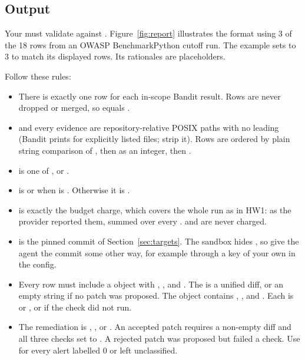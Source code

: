 \documentclass[9pt,letterpaper]{article}
\begin{document}
\subsection{Output}\label{sec:output}

Your  must validate against .
Figure~\ref{fig:report} illustrates the format using 3 of the 18 rows from an
OWASP BenchmarkPython cutoff run. The example sets  to 3 to
match its displayed rows. Its rationales are placeholders.

Follow these rules:
\begin{itemize}
\item There is exactly one row for each in-scope Bandit result. Rows are never
  dropped or merged, so  equals .
\item {} and every evidence  are repository-relative POSIX
  paths with no leading  (Bandit prints  for explicitly listed
  files; strip it). Rows are ordered by plain string comparison of ,
  then  as an integer, then .
\item {} is one of ,  or .
\item {} is  or  when  is .
  Otherwise it is .
\item {} is exactly the budget charge, which covers the
  whole run as in HW1:  as the provider reported them, summed
  over every .  and
   are never charged.
\item {} is the pinned commit of Section~\ref{sec:targets}.
  The sandbox hides , so give the agent the commit some other way, for
  example through a key of your own in the config.
\item Every row must include a  object with ,
  , and . The  is a unified diff, or an empty
  string if no patch was proposed. The  object contains
  , , and . Each is
   or , or  if the check did not run.
\item The remediation  is , , or
  . An accepted patch requires a non-empty diff and all three checks
  set to . A rejected patch was proposed but failed a check. Use
   for every alert labelled 0 or left unclassified.
\end{itemize}
\end{document}

